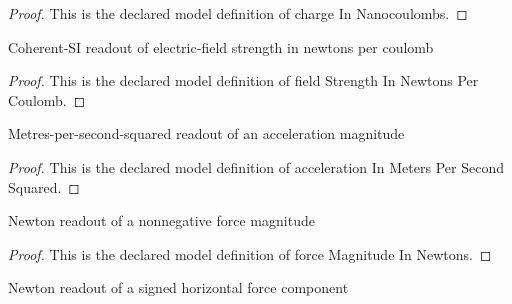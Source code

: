 \begin{proof}
  This is the declared model definition of charge In Nanocoulombs.
\end{proof}
\begin{definition}
  \label{def:physics:phyx-mini-0906:phyxminiproblems-problemphyxmini0906-fieldstrengthinnewtonspercoulomb}
  Coherent-SI readout of electric-field strength in newtons per coulomb
\end{definition}
\begin{proof}
  This is the declared model definition of field Strength In Newtons Per Coulomb.
\end{proof}
\begin{definition}
  \label{def:physics:phyx-mini-0906:phyxminiproblems-problemphyxmini0906-accelerationinmeterspersecondsquared}
  Metres-per-second-squared readout of an acceleration magnitude
\end{definition}
\begin{proof}
  This is the declared model definition of acceleration In Meters Per Second Squared.
\end{proof}
\begin{definition}
  \label{def:physics:phyx-mini-0906:phyxminiproblems-problemphyxmini0906-forcemagnitudeinnewtons}
  Newton readout of a nonnegative force magnitude
\end{definition}
\begin{proof}
  This is the declared model definition of force Magnitude In Newtons.
\end{proof}
\begin{definition}
  \label{def:physics:phyx-mini-0906:phyxminiproblems-problemphyxmini0906-forcecomponentinnewtons}
  Newton readout of a signed horizontal force component
\end{definition}
